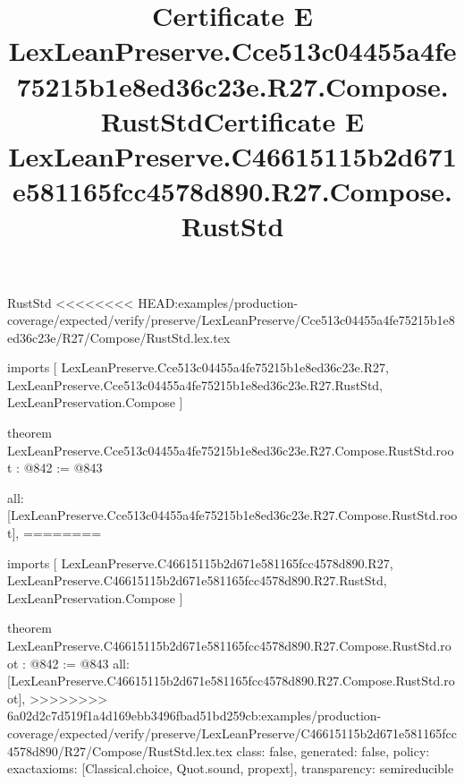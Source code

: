 \begin{lexlean}{RustStd}
<<<<<<<< HEAD:examples/production-coverage/expected/verify/preserve/LexLeanPreserve/Cce513c04455a4fe75215b1e8ed36c23e/R27/Compose/RustStd.lex.tex
\title{Certificate E LexLeanPreserve.Cce513c04455a4fe75215b1e8ed36c23e.R27.Compose.RustStd}
\begin{coremodule}
imports [
  LexLeanPreserve.Cce513c04455a4fe75215b1e8ed36c23e.R27,
  LexLeanPreserve.Cce513c04455a4fe75215b1e8ed36c23e.R27.RustStd,
  LexLeanPreservation.Compose
]

theorem LexLeanPreserve.Cce513c04455a4fe75215b1e8ed36c23e.R27.Compose.RustStd.root : @842 := @843 {
  all: [LexLeanPreserve.Cce513c04455a4fe75215b1e8ed36c23e.R27.Compose.RustStd.root],
========
\title{Certificate E LexLeanPreserve.C46615115b2d671e581165fcc4578d890.R27.Compose.RustStd}
\begin{coremodule}
imports [
  LexLeanPreserve.C46615115b2d671e581165fcc4578d890.R27,
  LexLeanPreserve.C46615115b2d671e581165fcc4578d890.R27.RustStd,
  LexLeanPreservation.Compose
]

theorem LexLeanPreserve.C46615115b2d671e581165fcc4578d890.R27.Compose.RustStd.root : @842 := @843 {
  all: [LexLeanPreserve.C46615115b2d671e581165fcc4578d890.R27.Compose.RustStd.root],
>>>>>>>> 6a02d2c7d519f1a4d169ebb3496fbad51bd259cb:examples/production-coverage/expected/verify/preserve/LexLeanPreserve/C46615115b2d671e581165fcc4578d890/R27/Compose/RustStd.lex.tex
  class: false,
  generated: false,
  policy: exact{axioms: [Classical.choice, Quot.sound, propext]},
  transparency: semireducible
}


\end{coremodule}}
\end{coremodule}
\end{lexlean}
